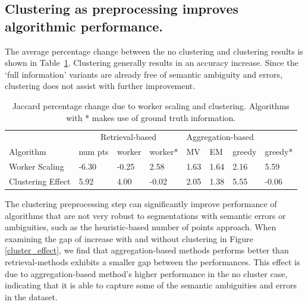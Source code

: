 \subsection{Clustering as preprocessing improves algorithmic performance.}
\par \noindent The average percentage change between the no clustering and clustering results is shown in Table~\ref{statsTable}. Clustering generally results in an accuracy increase. Since the `full information' variants are already free of semantic ambiguity and errors, clustering does not assist with further improvement. %
\begin{table}[h!]
   \small
      \begin{tabular}{l|l|l|l|l|l|l|l}
      & \multicolumn{3}{c|}{Retrieval-based} & \multicolumn{4}{l|}{Aggregation-based} \\
      Algorithm         & num pts     & worker    & worker*    & MV     & EM     & greedy   & greedy*   \\ \hline
      Worker Scaling    & -6.30       & -0.25     & 2.58       & 1.63   & 1.64   & 2.16     & 5.59      \\ \hline
      Clustering Effect & 5.92        & 4.00      & -0.02      & 2.05   & 1.38   & 5.55     & -0.06    
      \end{tabular}
      \vspace{10pt}
      \caption{Jaccard percentage change due to worker scaling and clustering. Algorithms with * makes use of ground truth information.}
      \label{statsTable}
\end{table}
\par The clustering preprocessing step can significantly improve performance of algorithms that are not very robust to segmentations with semantic errors or ambiguities, such as the heuristic-based number of points approach. When examining the gap of increase with and without clustering in Figure \ref{cluster_effect}, we find that aggregation-based methods performs better than retrieval-methods exhibits a smaller gap between the performances. This effect is due to aggregation-based method's higher performance in the no cluster case, indicating that it is able to capture some of the semantic ambiguities and errors in the dataset.
